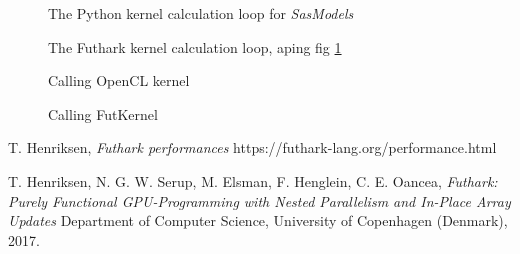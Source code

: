 \documentclass[11pt]{article}
\newcommand{\sasmodels}{\textit{SasModels}}
\begin{document}
\begin{figure}
  
  \label{fig:kernelpy_loop}
  \caption{The Python kernel calculation loop for \sasmodels}
\end{figure}

\begin{figure}
  
  \label{fig:kernelfut_loop}
  \caption{The Futhark kernel calculation loop, aping fig \ref{fig:kernelpy_loop}}
\end{figure}
\begin{figure}
  
  \label{fig:kernelcl_call}
  \caption{Calling OpenCL kernel}
\end{figure}

\begin{figure}
  
  \label{fig:kernelfut_call}
  \caption{Calling FutKernel}
\end{figure}

\begin{thebibliography}{1}

  T. Henriksen,
  \textit{Futhark performances}
  https://futhark-lang.org/performance.html

  T. Henriksen,
  N. G. W. Serup,
  M. Elsman,
  F. Henglein,
  C. E. Oancea,
  \textit{Futhark: Purely Functional GPU-Programming with Nested Parallelism 
  and In-Place Array Updates}
  Department of Computer Science,
  University of Copenhagen (Denmark),
  2017.

\end{thebibliography}
\end{document}
